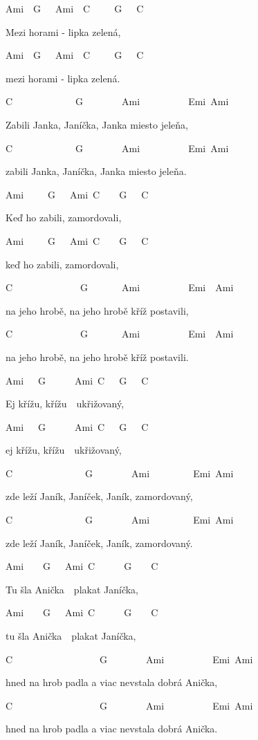 
Ami~~G~~~Ami~~C~~~~~G~~~C~~

Mezi horami - lipka zelená,

Ami~~G~~~Ami~~C~~~~~G~~~C~~

mezi horami - lipka zelená.

C~~~~~~~~~~~~~G~~~~~~~~Ami~~~~~~~~~~Emi~Ami

Zabili Janka, Janíčka, Janka miesto jeleňa,

C~~~~~~~~~~~~~G~~~~~~~~Ami~~~~~~~~~~Emi~Ami

zabili Janka, Janíčka, Janka miesto jeleňa.

\bigskip

Ami~~~~~G~~~Ami~C~~~~G~~~C~~

Keď ho zabili, zamordovali,

Ami~~~~~G~~~Ami~C~~~~G~~~C~~

keď ho zabili, zamordovali,

C~~~~~~~~~~~~~~G~~~~~~~Ami~~~~~~~~~~Emi~~Ami

na jeho hrobě, na jeho hrobě kříž postavili,

C~~~~~~~~~~~~~~G~~~~~~~Ami~~~~~~~~~~Emi~~Ami

na jeho hrobě, na jeho hrobě kříž postavili.

\bigskip

Ami~~~G~~~~~~Ami~C~~~G~~~C~~

Ej křížu, křížu~~ukřižovaný,

Ami~~~G~~~~~~Ami~C~~~G~~~C~~

ej křížu, křížu~~ukřižovaný,

C~~~~~~~~~~~~~~~G~~~~~~~~Ami~~~~~~~~~Emi~Ami

zde leží Janík, Janíček, Janík, zamordovaný,

C~~~~~~~~~~~~~~~G~~~~~~~~Ami~~~~~~~~~Emi~Ami

zde leží Janík, Janíček, Janík, zamordovaný.

\bigskip

Ami~~~~G~~~Ami~C~~~~~~G~~~~C~~

Tu šla Anička~~plakat Janíčka,

Ami~~~~G~~~Ami~C~~~~~~G~~~~C~~

tu šla Anička~~plakat Janíčka,

C~~~~~~~~~~~~~~~~~~G~~~~~~~~Ami~~~~~~~~~~Emi~Ami

hned na hrob padla a viac nevstala dobrá Anička,

C~~~~~~~~~~~~~~~~~~G~~~~~~~~Ami~~~~~~~~~~Emi~Ami

hned na hrob padla a viac nevstala dobrá Anička.